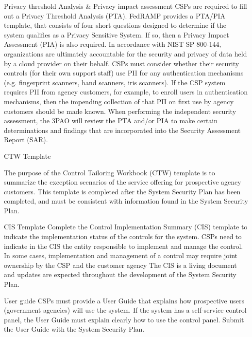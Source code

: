 \documentclass[../main.tex]{subfiles}
\begin{document}
Privacy threshold Analysis & Privacy impact assessment
CSPs are required to fill out a Privacy Threshold Analysis (PTA).
FedRAMP provides a PTA/PIA template, that consists of four short questions designed to determine if the system qualifies as a Privacy Sensitive System. If so, then a Privacy Impact Assessment (PIA) is also required.
In accordance with NIST SP 800-144, organizations are ultimately accountable for the security and privacy of data held by a cloud provider on their behalf.
CSPs must consider whether their security controls (for their own support staff) use PII for any authentication mechanisms (e.g. fingerprint scanners, hand scanners, iris scanners). If the CSP system requires PII from agency customers, for example, to enroll users in authentication mechanisms, then the impending collection of that PII on first use by agency customers should
be made known.
When performing the independent security assessment, the 3PAO will review the PTA and/or PIA to make certain determinations and findings that are incorporated into the Security Assessment Report (SAR).

CTW Template

The purpose of the Control Tailoring Workbook (CTW) template is to summarize the exception scenarios of the service offering for prospective agency customers. This template is completed after the System Security Plan has been completed, and must be consistent with information found in the System Security Plan.

CIS Template
Complete the Control Implementation Summary (CIS) template to indicate the implementation status of the controls for the system.
CSPs need to indicate in the CIS the entity responsible to implement and manage the control. In some cases, implementation and management of a control may require joint ownership by the CSP and the customer agency
The CIS is a living document and updates are expected throughout the development of the System Security Plan.

User guide
CSPs must provide a User Guide that explains how prospective users (government agencies) will use the system. If the system has a self-service control panel, the User Guide must explain clearly how to use the control panel. Submit the User Guide with the System Security Plan.
\end{document}
